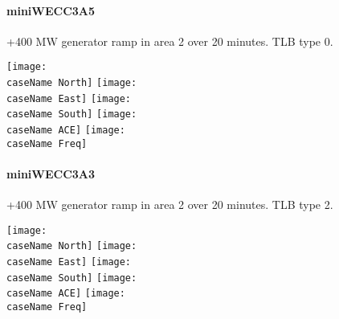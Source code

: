 \documentclass[12pt]{article}
\newcommand{\caseName}{ }
\begin{document}
\pagebreak

\renewcommand{\caseName}{miniWECC3A5}
\paragraph{miniWECC3A5} +400 MW generator ramp in area 2 over 20 minutes. TLB type 0.

	\texttt{[image: \\caseName North]}
	\texttt{[image: \\caseName East]} 
	\texttt{[image: \\caseName South]} 
	\texttt{[image: \\caseName ACE]} 
	\texttt{[image: \\caseName Freq]} 
	
\pagebreak

\renewcommand{\caseName}{miniWECC3A3}
\paragraph{miniWECC3A3} +400 MW generator ramp in area 2 over 20 minutes. TLB type 2.

	\texttt{[image: \\caseName North]}
	\texttt{[image: \\caseName East]} 
	\texttt{[image: \\caseName South]} 
	\texttt{[image: \\caseName ACE]} 
	\texttt{[image: \\caseName Freq]} 
\end{document}

